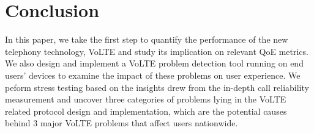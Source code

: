 \section{Conclusion}
\label{sec:conclusion}
In this paper, we take the first step to quantify the performance of the new telephony technology, VoLTE and study its implication on relevant QoE metrics. We also design and implement a VoLTE problem detection tool running on end users' devices to examine the impact of these problems on user experience. We peform stress testing based on the insights drew from the in-depth call reliability measurement and uncover three categories of problems lying in the VoLTE related protocol design and implementation, which are the potential causes behind 3 major VoLTE problems that affect users nationwide.    
